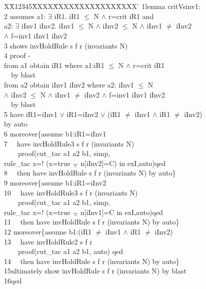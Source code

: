 \documentclass[final]{IEEEtran}
\newlength{\fminilength}
\newenvironment{fmini}[1][\linewidth]
  {\setlength{\fminilength}{#1\fboxsep-2\fboxrule}%
   \vspace{2ex}\noindent\begin{lrbox}{\fminibox}\begin{minipage}{\fminilength}%
   \mbox{ }\hfill\vspace{-2.5ex}}%
  {\end{minipage}\end{lrbox}\vspace{1ex}\hspace{0ex}%
   \framebox{\usebox{\fminibox}}}
\newenvironment{specification}
{\noindent\scriptsize
\tt\begin{fmini}\begin{tabbing}X\=X12345\=XXXX\=XXXX\=XXXX\=XXXX\=XXXX
\=\+\kill} {\end{tabbing}\normalfont\end{fmini}}
\def \twoSpaces {\ \ }
\def \andc {\barwedge }
\def \negc {!}
\def \iInv {iInv}
\def \iR {iR}
\begin{document}
\begin{specification}
1lemma critVsinv1:\\
2  assumes  a1: $\exists$ \iR1. \iR1 $\le$ N $\wedge$ r=crit \iR1 and \\
  a2: $\exists$  \iInv1 \iInv2. \iInv1 $\le$ N $\wedge$ \iInv2 $\le$ N $\wedge$ \iInv1 $\neq$ \iInv2 \\
   $\wedge$ f=inv1  \iInv1 \iInv2\\
3  shows  invHoldRule s f r (invariants
  N)\\
4  proof -\\
   from a1 obtain \iR1 where a1:\iR1 $\le$ N $\wedge$ r=crit \iR1 \\
\twoSpaces   by blast\\
   from a2 obtain \iInv1 \iInv2 where a2: \iInv1 $\le$ N \\
   $\wedge$ \iInv2 $\le$ N $\wedge$ \iInv1 $\neq$ \iInv2 $\wedge$ f=inv1  \iInv1 \iInv2\\
\twoSpaces   by blast \\
5  have iR1=\iInv1 $\vee$ \iR1=\iInv2 $\vee$ (\iR1 $\ne$ \iInv1 $\wedge$  \iR1 $\ne$ \iInv2) \\
  by auto\\

6  moreover\{assume  b1:\iR1=\iInv1\\
7  \twoSpaces have invHoldRule3 s f r (invariants N)\\
 \twoSpaces  \twoSpaces   proof(cut\_tac a1 a2 b1, simp, \\
 rule\_tac x=$\negc$ (x=true $\andc$ n[\iInv2]=C)  in exI,auto)qed\\
8  \twoSpaces then have invHoldRule s f r
(invariants
  N)
by auto\}\\

9  moreover\{assume  b1:iR1=\iInv2\\
10 \twoSpaces have invHoldRule3 s f r (invariants N)\\
 \twoSpaces \twoSpaces   proof(cut\_tac a1 a2 b1, simp, \\
 rule\_tac x=$\negc$ (x=true $\andc$ n[\iInv1]=C  in exI,auto)qed\\
11 \twoSpaces then have invHoldRule s f r (invariants
  N)
by auto\}\\

12   moreover\{assume  b1:(\iR1 $\ne$  \iInv1 $\wedge$   \iR1 $\ne$  \iInv2)\\
13 \twoSpaces have invHoldRule2 s f r  \\
  \twoSpaces \twoSpaces  proof(cut\_tac a1 a2 b1,  auto) qed\\
14 \twoSpaces then have invHoldRule s f r
(invariants
  N)
by auto\} \\

15ultimately show invHoldRule s f r
(invariants N) by blast\\
16qed\\
\end{specification}
\end{document}
